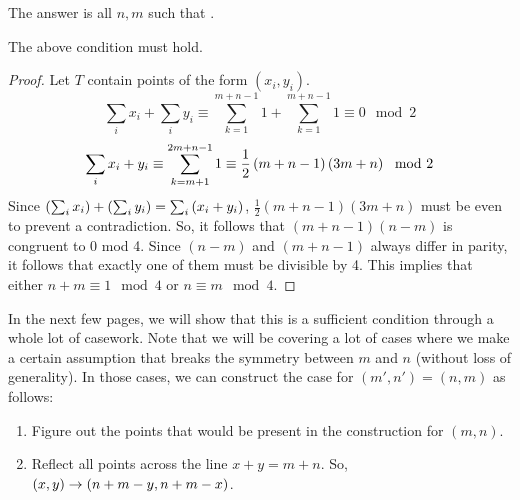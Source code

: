 \documentclass[10pt]{../usamts}
\begin{document}
\begin{solution}
The answer is all $n,m$ such that .

\begin{claim}
    The above condition must hold.
\end{claim}
\begin{proof}
    Let $T$ contain points of the form $(x_i,y_i)$.
    $$\sum_i x_i + \sum_i y_i \equiv \sum_{k=1}^{m+n-1} 1 + \sum_{k=1}^{m+n-1} 1 \equiv 0 \mod 2$$
    $$\sum_i x_i + y_i \equiv \sum_{k=m+1}^{2m+n-1} 1 \equiv \frac{1}{2} \left( m+n-1 \right)\left( 3m+n \right) \mod 2$$
    Since $\left( \sum_i x_i \right) + \left( \sum_i y_i \right) = \sum_i \left( x_i+y_i \right)$, $\frac{1}{2} (m+n-1)(3m+n)$ must be even to prevent a contradiction.
    So, it follows that $(m+n-1)(n-m)$ is congruent to 0 mod 4. Since $(n-m)$ and $(m+n-1)$ always differ in parity, it follows that exactly one of them must be divisible by 4. This implies that either $n+m \equiv 1 \mod 4$ or $n \equiv m \mod 4$.
\end{proof}

\newcommand{\mainaxis}{
    Select the points on the main axis so that each diagonal intersects exactly one point:
    \begin{enumerate}
        \item Select all the points of the form $(m, m+2k-1)$ for $1 \leq k \leq \floor{\frac{n}{2}}$
        \item Select all the points of the form $(m, m-2k)$ for $1 \leq k \leq \floor{\frac{m-1}{2}}$
        \item Select all the points of the form $(m+2k, m)$ for $1 \leq k \leq \floor{\frac{n-1}{2}}$
        \item Select all the points of the form $(m-2k+1, m)$ for $1 \leq k \leq \floor{\frac{m}{2}}$
    \end{enumerate}
}

In the next few pages, we will show that this is a sufficient condition through a whole lot of casework. Note that we will be covering a lot of cases where we make a certain assumption that breaks the symmetry between $m$ and $n$ (without loss of generality). In those cases, we can construct the case for $(m',n') = (n,m)$ as follows:

\begin{enumerate}
    \item Figure out the points that would be present in the construction for $(m,n)$.
    \item Reflect all points across the line $x+y=m+n$. So, $(x,y) \rightarrow \left( n+m - y, n+m - x \right)$.
\end{enumerate}


\end{solution}
\end{document}
